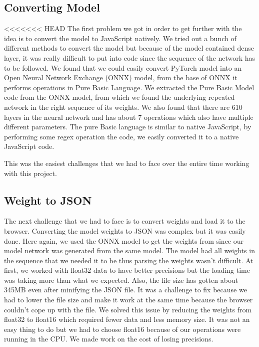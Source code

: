 \documentclass[a4paper,12pt]{article}
\begin{document}
\subsection{Converting Model}
<<<<<<< HEAD
The first problem we got in order to get further with the idea is to convert the model to JavaScript natively. We tried out a bunch of different methods to convert the model but because of the model contained dense layer, it was really difficult to put into code since the sequence of the network has to be followed. We found that we could easily convert PyTorch model into an Open Neural Network Exchange (ONNX) model, from the base of ONNX it performs operations in Pure Basic Language. We extracted the Pure Basic Model code from the ONNX model, from which we found the underlying repeated network in the right sequence of its weights. We also found that there are 610 layers in the neural network and has about 7 operations which also have multiple different parameters. The pure Basic language is similar to native JavaScript, by performing some regex operation the code, we easily converted it to a native JavaScript code. 

This was the easiest challenges that we had to face over the entire time working with this project.

\subsection{Weight to JSON}
The next challenge that we had to face is to convert weights and load it to the browser. Converting the model weights to JSON was complex but it was easily done. Here again, we used the ONNX model to get the weights from since our model network was generated from the same model. The model had all weights in the sequence that we needed it to be thus parsing the weights wasn't difficult. At first, we worked with float32 data to have better precisions but the loading time was taking more than what we expected. Also, the file size has gotten about 345MB even after minifying the JSON file. It was a challenge to fix because we had to lower the file size and make it work at the same time because the browser couldn't cope up with the file. We solved this issue by reducing the weights from float32 to float16 which required fewer data and less memory size. It was not an easy thing to do but we had to choose float16 because of our operations were running in the CPU. We made work on the cost of losing precisions.
\end{document}
